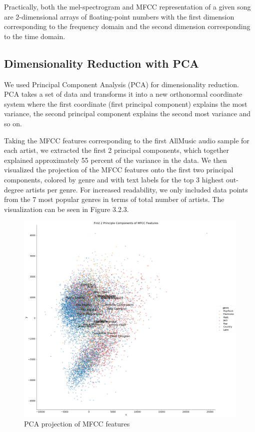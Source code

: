 Practically, both the mel-spectrogram and MFCC representation of a given song are 2-dimensional arrays of floating-point numbers with the first dimension corresponding to the frequency domain and the second dimension corresponding to the time domain. 

\subsection{Dimensionality Reduction with PCA}
We used Principal Component Analysis (PCA) for dimensionality reduction. PCA takes a set of data and transforms it into a new orthonormal coordinate system where the first coordinate (first principal component) explains the most variance, the second principal component explains the second most variance and so on.

Taking the MFCC features corresponding to the first AllMusic audio sample for each artist, we extracted the first 2 principal components, which together explained approximately 55 percent of the variance in the data. We then visualized the projection of the MFCC features onto the first two principal components, colored by genre and with text labels for the top 3 highest out-degree artists per genre. For increased readability, we only included data points from the 7 most popular genres in terms of total number of artists. The visualization can be seen in Figure 3.2.3.

\newpage
\begin{figure}[H]
\includegraphics[width=15cm]{figures/mfcc_pca.png}
\caption{PCA projection of MFCC features}
\end{figure}

